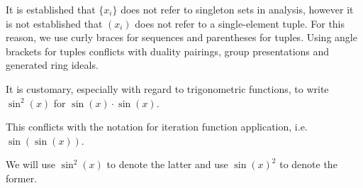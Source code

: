 \begin{enumerate}
  It is established that \( \{ x_i \} \) does not refer to singleton sets in analysis, however it is not established that \( ( x_i ) \) does not refer to a single-element tuple. For this reason, we use curly braces for sequences and parentheses for tuples. Using angle brackets for tuples conflicts with duality pairings, group presentations and generated ring ideals.

   It is customary, especially with regard to trigonometric functions, to write \( \sin^2(x) \) for \( \sin(x) \cdot \sin(x) \).

  This conflicts with the notation for iteration function application, i.e. \( \sin(\sin(x)) \).

  We will use \( \sin^2(x) \) to denote the latter and use \( \sin(x)^2 \) to denote the former.
\end{enumerate}
